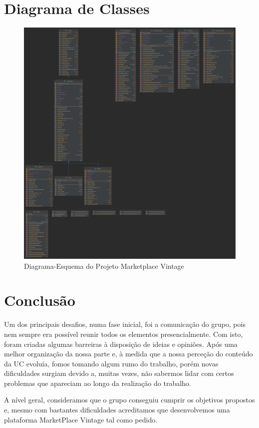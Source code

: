 \documentclass[a4paper]{report}
\begin{document}
    \chapter{Diagrama de Classes}
		\begin{figure}[H]
			\includegraphics[scale = 0.07]{diagrama.png}
                \caption{Diagrama-Esquema do Projeto Marketplace Vintage}
		\end{figure}

    \chapter{Conclusão}
    \par Um dos principais desafios, numa fase inicial, foi a comunicação do grupo, pois nem sempre era possível reunir todos os elementos presencialmente. Com isto, foram criadas algumas barreiras à disposição de ideias e opiniões. Após uma melhor organização da nossa parte e, à medida que a nossa perceção do conteúdo da UC evoluía, fomos tomando algum rumo do trabalho, porém novas dificuldades surgiam devido a, muitas vezes, não sabermos lidar com certos problemas que apareciam ao longo da realização do trabalho.
    \par
    A nível geral, consideramos que o grupo conseguiu cumprir os objetivos propostos e, mesmo com bastantes dificuldades acreditamos que desenvolvemos uma plataforma MarketPlace Vintage tal como pedido.
    \par
\end{document}
